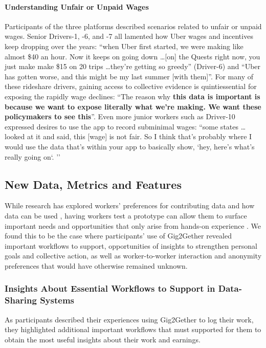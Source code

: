 \paragraph{\textbf{Understanding Unfair or Unpaid Wages}}
Participants of the three platforms described scenarios related to unfair or unpaid wages. Senior Drivers-1, -6, and -7 all lamented how Uber wages and incentives keep dropping over the years: ``when Uber first started, we were making like almost \$40 an hour. Now it keeps on going down \dots [on] the Quests right now, you just make make \$15 on 20 trips \dots they're getting so greedy'' (Driver-6) and ``Uber has gotten worse, and this might be my last summer [with them]''. For many of these rideshare drivers, gaining access to collective evidence is quintiessential for exposing the rapidly wage declines: ``The reason why \textbf{this data is important is because we want to expose literally what we're making. We want these policymakers to see this}''. Even more junior workers such as Driver-10 expressed desires to use the app to record subminimal wages: ``some states \dots looked at it and said, this [wage] is not fair. So I think that's probably where I would use the data that's within your app to basically show, `hey, here's what's really going on`. ''



\subsection{New Data, Metrics and Features}\label{Findings_Improvement}
{While research has explored workers' preferences for contributing data and how data can be used \cite{stein2023you, supporting}, having workers test a prototype can allow them to surface important needs and opportunities that only arise from hands-on experience \cite{rogers2007s}. We found this to be the case where participants' use of Gig2Gether revealed important workflows to support, opportunities of insights to strengthen personal goals and collective action, as well as worker-to-worker interaction and anonymity preferences that would have otherwise remained unknown.} %

\subsubsection{{Insights About Essential Workflows to Support in Data-Sharing Systems}}

{As participants described their experiences using Gig2Gether to log their work, they highlighted additional important workflows that must supported for them to obtain the most useful insights about their work and earnings.}

